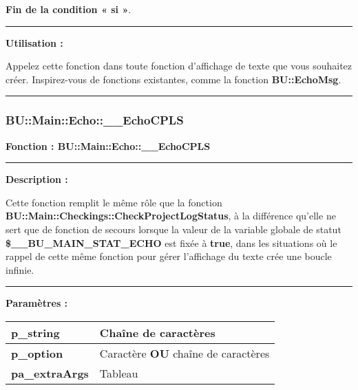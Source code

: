 \documentclass[a4paper,10pt]{article}
\begin{document}
\begin{justify}
    \textbf{\color{cond}Fin de la condition « si »}.
\end{justify}


\par\noindent\rule{\textwidth}{0.4pt}

\begin{justify}
    \textbf{Utilisation :}

    Appelez cette fonction dans toute fonction d'affichage de texte que vous souhaitez créer. Inspirez-vous de fonctions existantes, comme la fonction \textbf{\color{func}BU::EchoMsg}.
\end{justify}



\color{sec3}\par\noindent\rule{\textwidth}{0.4pt}\color{text}

\color{sec3}
\subsubsection{BU::Main::Echo::\_\_EchoCPLS}\color{text}

\begin{justify}
    \textbf{Fonction : \color{func}BU::Main::Echo::\_\_EchoCPLS}
\end{justify}


\par\noindent\rule{\textwidth}{0.4pt}

\begin{justify}
    \textbf{Description :}

    Cette fonction remplit le même rôle que la fonction \textbf{\color{func}BU::Main::Checkings::CheckProjectLogStatus}, à la différence qu'elle ne sert que de fonction de secours lorsque la valeur de la variable globale de statut \textbf{\color{vars}\$\_\_BU\_MAIN\_STAT\_ECHO} est fixée à \textbf{true}, dans les situations où le rappel de cette même fonction pour gérer l'affichage du texte crée une boucle infinie.
\end{justify}


\par\noindent\rule{\textwidth}{0.4pt}

\begin{justify}
    \textbf{Paramètres :}

    \begin{tabular}{|l|l|}
        \hline
        \textbf{\color{vars}p\_string} & Chaîne de caractères\\
        \hline
        \textbf{\color{vars}p\_option} & Caractère \textbf{OU} chaîne de caractères\\
        \hline
        \textbf{\color{vars}pa\_extraArgs} & Tableau\\
        \hline
    \end{tabular}
\end{justify}
\end{document}
